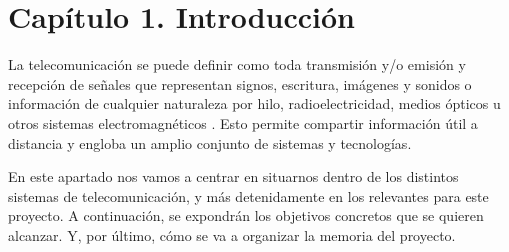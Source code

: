 
\chapter{Capítulo 1. Introducción}
\label{introduccion}
\par La telecomunicación se puede definir como toda transmisión y/o emisión y recepción de señales que representan signos, escritura, imágenes y sonidos o información de cualquier naturaleza por hilo, radioelectricidad, medios ópticos u otros sistemas electromagnéticos \cite{RAI}. Esto permite compartir información útil a distancia y engloba un amplio conjunto de sistemas y tecnologías. 
\\
\par En este apartado nos vamos a centrar en situarnos dentro de los distintos sistemas de telecomunicación, y más detenidamente en los relevantes para este proyecto. A continuación, se expondrán los objetivos concretos que se quieren alcanzar. Y, por último, cómo se va a organizar la memoria del proyecto. 

